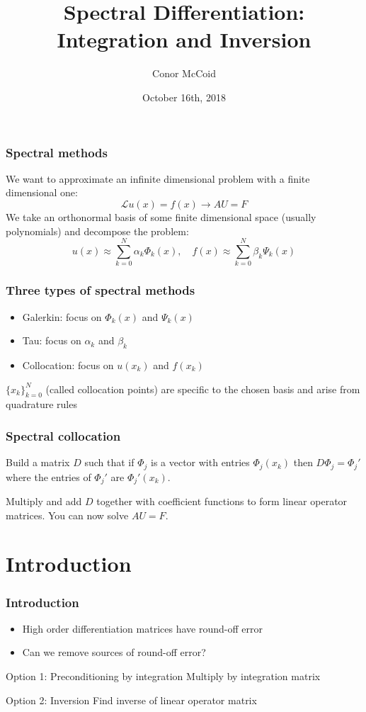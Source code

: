 \documentclass{beamer}
\title{Spectral Differentiation: Integration and Inversion}
\author{Conor McCoid}
\institute{University of Geneva}
\date{October 16th, 2018}
\begin{document}
\frame{\titlepage}

\begin{frame}
\frametitle{Spectral methods}
We want to approximate an infinite dimensional problem with a finite dimensional one:
\begin{equation*}
\mathcal{L} u(x) = f(x) \rightarrow A U = F
\end{equation*}
We take an orthonormal basis of some finite dimensional space (usually polynomials) and decompose the problem:
\begin{equation*}
u(x) \approx \sum_{k=0}^N \alpha_k \Phi_k(x), \quad f(x) \approx \sum_{k=0}^N \beta_k \Psi_k(x)
\end{equation*}
\end{frame}

\begin{frame}
\frametitle{Three types of spectral methods}
\begin{itemize}
\item Galerkin: focus on $\Phi_k(x)$ and $\Psi_k(x)$
\item Tau: focus on $\alpha_k$ and $\beta_k$
\item Collocation: focus on $u(x_k)$ and $f(x_k)$
\end{itemize}
$\{ x_k \}_{k=0}^N$ (called collocation points) are specific to the chosen basis and arise from quadrature rules
\end{frame}

\begin{frame}
\frametitle{Spectral collocation}
Build a matrix $D$ such that if $\Phi_j$ is a vector with entries $\Phi_j(x_k)$ then $D \Phi_j = \Phi_j'$
where the entries of $\Phi_j'$ are $\Phi_j'(x_k)$.

Multiply and add $D$ together with coefficient functions to form linear operator matrices.
You can now solve $A U = F$.
\end{frame}

\section{Introduction}

\begin{frame}
\frametitle{Introduction}
\begin{itemize}
\item High order differentiation matrices have round-off error
\item Can we remove sources of round-off error?
\end{itemize}

\begin{block}{Option 1: Preconditioning by integration}
Multiply by integration matrix
\end{block}

\begin{block}{Option 2: Inversion}
Find inverse of linear operator matrix
\end{block}
\end{frame}
\end{document}
